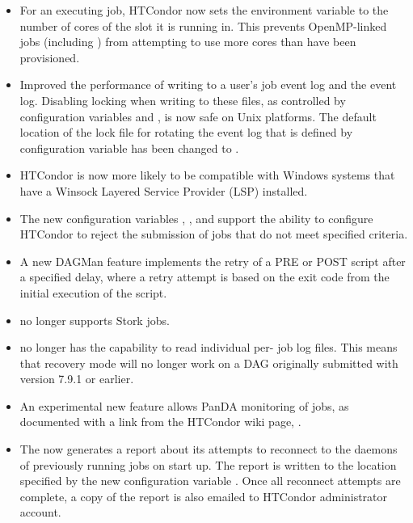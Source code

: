 \begin{itemize}
\item For an executing job, HTCondor now sets the environment variable 
 to the number of cores of the slot it is running in.
This prevents OpenMP-linked jobs (including ) 
from attempting to use more cores than have been provisioned.

\item Improved the performance of writing to a user's job event log 
and the event log.
Disabling locking when writing to these files,
as controlled by configuration variables 
and , is now safe on Unix platforms.
The default location of the lock file for rotating the event log
that is defined by configuration variable
 has been changed to
.

\item HTCondor is now more likely to be compatible with Windows systems
that have a Winsock Layered Service Provider (LSP) installed.

\item The new configuration variables ,
, 
and 
support the ability to configure HTCondor to reject the submission
of jobs that do not meet specified criteria.

\item A new DAGMan feature implements the retry of a PRE or POST script 
after a specified delay, 
where a retry attempt is
based on the exit code from the initial execution of the script.

\item {} no longer supports Stork jobs.

\item {} no longer has the capability to read individual per-
job log files.  This means that recovery mode will no longer work on a
DAG originally submitted with version 7.9.1 or earlier.

\item An experimental new feature allows PanDA monitoring of jobs,
as documented with a link from the HTCondor wiki page,
.

\item The  now generates a report about its attempts to
reconnect to the  daemons of previously running jobs on start up.
The report is written to the location specified by the new configuration
variable .
Once all reconnect attempts are complete, a copy of the report is also
emailed to HTCondor administrator account.


\end{itemize}
